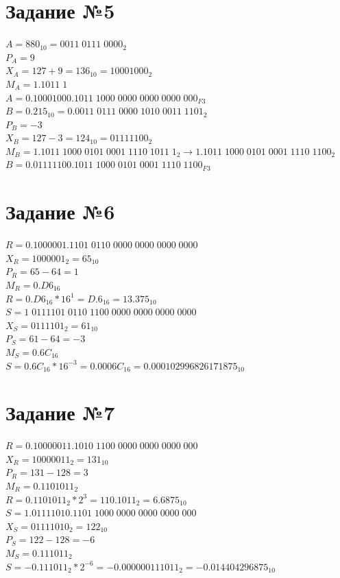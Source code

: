 \documentclass[12pt,a4paper]{report}
\begin{document}
\section*{Задание №5}
$A=880_{10}=0011\;0111\;0000_2$\\
$P_A=9$\\
$X_A=127+9=136_{10}=10001000_{2}$\\
$M_A=1.1011\;1$\\
$A=0.10001000.1011\;1000\;0000\;0000\;0000\;000_{F3}$\\
\hfill\break
$B=0.215_{10}=0.0011\;0111\;0000\;1010\;0011\;1101_2$\\
$P_B=-3$\\
$X_B=127-3=124_{10}=01111100_2$\\
$M_B=1.1011\;1000\;0101\;0001\;1110\;1011\;1_2\rightarrow1.1011\;1000\;0101\;0001\;1110\;1100_2$\\
$B=0.01111100.1011\;1000\;0101\;0001\;1110\;1100_{F3}$
\section*{Задание №6}
$R=0.1000001.1101\;0110\;0000\;0000\;0000\;0000$\\
$X_R=1000001_2=65_{10}$\\
$P_R=65-64=1$\\
$M_R=0.D6_{16}$\\
$R=0.D6_{16} * 16^1=D.6_{16}=13.375_{10}$\\
\hfill\break
$S=1\;0111101\;0110\;1100\;0000\;0000\;0000\;0000$\\
$X_S=0111101_2=61_{10}$\\
$P_S=61-64=-3$\\
$M_S=0.6C_{16}$\\
$S=0.6C_{16} * 16^{-3}=0.0006C_{16}=0.000102996826171875_{10}$
\section*{Задание №7}
$R=0.10000011.1010\;1100\;0000\;0000\;0000\;000$\\
$X_R=10000011_2=131_{10}$\\
$P_R=131-128=3$\\
$M_R=0.1101011_2$\\
$R=0.1101011_2 * 2^3=110.1011_2=6.6875_{10}$\\
\hfill\break
$S=1.01111010.1101\;1000\;0000\;0000\;0000\;000$\\
$X_S=01111010_2=122_{10}$\\
$P_S=122-128=-6$\\
$M_S=0.111011_2$\\
$S=-0.111011_2 * 2^{-6}=-0.000000111011_2=-0.014404296875_{10}$
\end{document}
